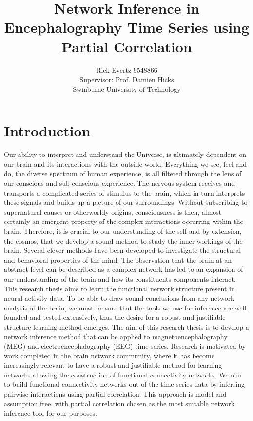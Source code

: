 \documentclass[11pt]{article}
\def\ni{\noindent}
\begin{document}
\title{\bf{Network Inference in Encephalography Time Series using Partial Correlation}}
\author{Rick Evertz 9548866\\
Supervisor: Prof. Damien Hicks\\
Swinburne University of Technology}
\date{}
\maketitle


\section{Introduction}
Our ability to interpret and understand the Universe, is ultimately dependent on our brain and its interactions with the outside world. Everything we see, feel and do, the diverse spectrum of human experience, is all filtered through the lens of our conscious and sub-conscious experience. The nervous system receives and transports a complicated series of stimulus to the brain, which in turn interprets these signals and builds up a picture of our surroundings. Without subscribing to supernatural causes or otherworldy origins, consciousness is then, almost certainly an emergent property of the complex interactions occurring within the brain. Therefore, it is crucial to our understanding of the self and by extension, the cosmos, that we develop a sound method to study the inner workings of the brain. Several clever methods have been developed to investigate the structural and behavioral properties of the mind. The observation that the brain at an abstract level can be described as a complex network has led to an expansion of our understanding of the brain and how its constituents components interact. This research thesis aims to learn the functional network structure present in neural activity data. To be able to draw sound conclusions from any network analysis of the brain, we must be sure that the tools we use for inference are well founded and tested extensively, thus the desire for a robust and justifiable structure learning method emerges. The aim of this research thesis is to develop a network inference method that can be applied to magnetoencephalography (MEG) and electroencephalography (EEG) time series. Research is motivated by work completed in the brain network community, where it has become increasingly relevant to have a robust and justifiable method for learning networks allowing the construction of functional connectivity networks. We aim to build functional connectivity networks out of the time series data by inferring pairwise interactions using partial correlation. This approach is model and assumption free, with partial correlation chosen as the most suitable network inference tool for our purposes.
\end{document}
